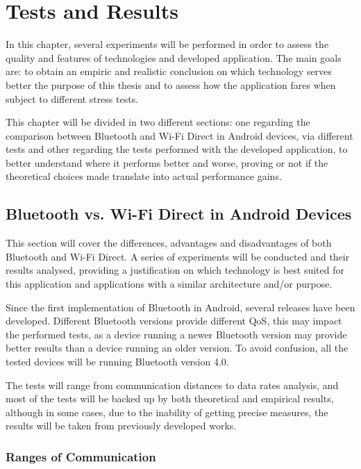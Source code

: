 \chapter{Tests and Results}
\label{chapter:tests}

In this chapter, several experiments will be performed in order to assess the quality and features of technologies and developed application. The main goals are: to obtain an empiric and realistic conclusion on which technology serves better the purpose of this thesis and to assess how the application fares when subject to different stress tests.

This chapter will be divided in two different sections: one regarding the comparison between Bluetooth and Wi-Fi Direct in Android devices, via different tests and other regarding the tests performed with the developed application, to better understand where it performs better and worse, proving or not if the theoretical choices made translate into actual performance gains.

\section{Bluetooth vs. Wi-Fi Direct in Android Devices}

This section will cover the differences, advantages and disadvantages of both Bluetooth and Wi-Fi Direct. A series of experiments will be conducted and their results analysed, providing a justification on which technology is best suited for this application and applications with a similar architecture and/or purpose.

Since the first implementation of Bluetooth in Android, several releases have been developed. Different Bluetooth versions provide different \gls{QoS}, this may impact the performed tests, as a device running a newer Bluetooth version may provide better results than a device running an older version. To avoid confusion, all the tested devices will be running Bluetooth version 4.0.

The tests will range from communication distances to data rates analysis, and most of the tests will be backed up by both theoretical and empirical results, although in some cases, due to the inability of getting precise measures, the results will be taken from previously developed works.

\subsection{Ranges of Communication}
\label{subsec:ranges}

